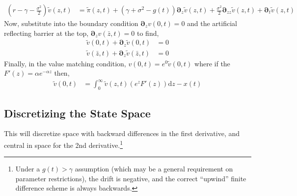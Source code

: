 \documentclass[11pt]{article}
\newcommand{\D}[1][]{\ensuremath{\boldsymbol{\partial}_{#1}}}
\newcommand{\diff}{\ensuremath{\mathrm{d}}}
\begin{document}
\begin{align}
	\left(r - \gamma - \frac{\sigma^2}{2}\right) \tilde{v}(z,t) &= \tilde{\pi}(z,t) + (\gamma + \sigma^2 - g(t)) \D[z] \tilde{v}(z,t) + \tfrac{\sigma^2}{2} \D[zz] \tilde{v}(z,t) + \D[t]\tilde{v}(z,t)\label{eq:bellman-GBM-dynamic-normalized}
\end{align}
Now, substitute into the boundary condition $\D[z]v(0,t) = 0$ and the artificial reflecting barrier at the top, $\D[z]v(\bar{z},t) = 0$ to find,
\begin{align}
	\tilde{v}(0,t) + \D[z]\tilde{v}(0,t ) &= 0\\
	\tilde{v}(\bar{z},t) + \D[z]\tilde{v}(\bar{z},t) &= 0
\end{align}	
Finally, in the value matching condition, $v(0,t) = e^{0}\tilde{v}(0,t)$ where if the $F'(z) = \alpha e^{-\alpha z}$ then,
\begin{align}
	\tilde{v}(0,t) &= \int_{0}^{\infty} \tilde{v}(z,t) \left(e^z F'(z)\right) \diff z - x(t)\label{eq:vm-GBM-dynamic-normalized}
\end{align}	





\subsection{Discretizing the State Space}\label{eq:discretization}
This will discretize space with backward differences in the first derivative, and central in space for the 2nd derivative.\footnote{Under a $g(t) > \gamma$ assumption (which may be a general requirement on parameter restrictions), the drift is negative, and the correct ``upwind'' finite difference scheme is always backwards.}
\end{document}
